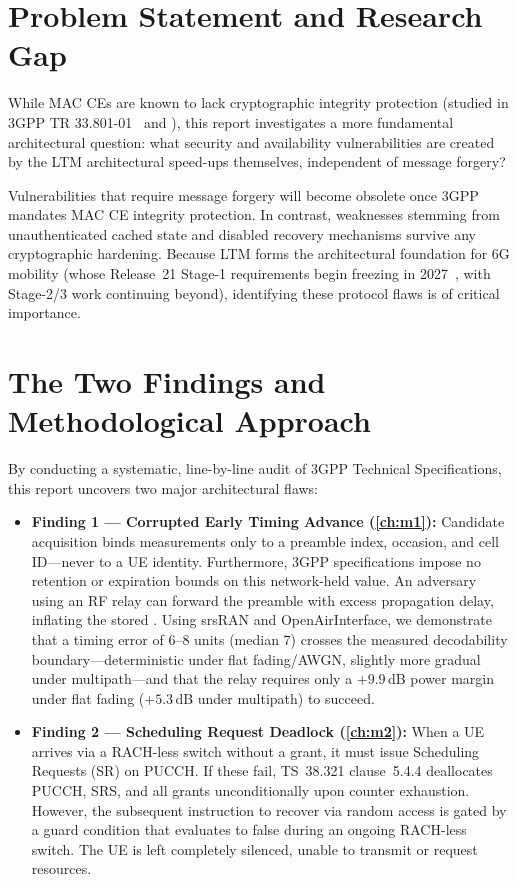\section{Problem Statement and Research Gap}

While MAC CEs are known to lack cryptographic integrity protection (studied in 3GPP TR
33.801-01~\cite{3gpp33801} and \cite{hatinen2026overshadowing}), this report investigates a more
fundamental architectural question: what security and availability vulnerabilities are created
by the LTM architectural speed-ups themselves, independent of message forgery?

Vulnerabilities that require message forgery will become obsolete once 3GPP mandates MAC CE integrity
protection. In contrast, weaknesses stemming from unauthenticated cached state and disabled recovery
mechanisms survive any cryptographic hardening. Because LTM forms the architectural foundation for
6G mobility (whose Release~21 Stage-1 requirements begin freezing in 2027~\cite{3gpp2026rel21}, with
Stage-2/3 work continuing beyond), identifying these protocol flaws is of critical importance.

\section{The Two Findings and Methodological Approach}

By conducting a systematic, line-by-line audit of 3GPP Technical Specifications, this report uncovers
two major architectural flaws:
\begin{itemize}\itemsep2pt
  \item \textbf{Finding 1 --- Corrupted Early Timing Advance (\cref{ch:m1}):} Candidate \TA{} acquisition
        binds measurements only to a preamble index, occasion, and cell ID---never to a UE identity.
        Furthermore, 3GPP specifications impose no retention or expiration bounds on this network-held
        value. An adversary using an RF relay can forward the preamble with excess propagation delay,
        inflating the stored \TA{}. Using srsRAN and OpenAirInterface, we demonstrate that a timing error
        of 6--8 units (median 7) crosses the measured decodability boundary---deterministic under flat
        fading/AWGN, slightly more gradual under multipath---and that the relay requires only a
        $+9.9$\,dB power margin under flat fading ($+5.3$\,dB under multipath) to succeed.
  \item \textbf{Finding 2 --- Scheduling Request Deadlock (\cref{ch:m2}):} When a UE arrives via a
        RACH-less switch without a grant, it must issue Scheduling Requests (SR) on PUCCH. If these fail,
        TS~38.321 clause~5.4.4 deallocates PUCCH, SRS, and all grants unconditionally upon counter
        exhaustion. However, the subsequent instruction to recover via random access is gated by a guard
        condition that evaluates to false during an ongoing RACH-less switch. The UE is left completely
        silenced, unable to transmit or request resources.
\end{itemize}

